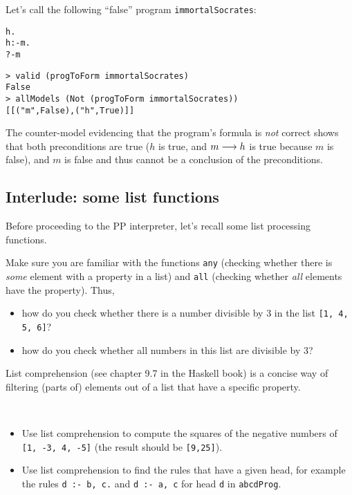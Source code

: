 \documentclass[english]{article}
\begin{document}
Let's call the following ``false'' program \texttt{immortalSocrates}:
\begin{alltt}
  h.
  h :- m.
  ?- m
\end{alltt}

\begin{lstlisting}
> valid (progToForm immortalSocrates)
False
> allModels (Not (progToForm immortalSocrates))
[[("m",False),("h",True)]]
\end{lstlisting}
The counter-model evidencing that the program's formula is \emph{not} correct
shows that both preconditions are true ($h$ is true, and $m \longrightarrow h$ is true
because $m$ is false), and $m$ is false and thus cannot be a conclusion of the
preconditions.


\subsection{Interlude: some list functions}\label{sec:list_functions}

Before proceeding to the PP interpreter, let's recall some list processing functions.

\begin{exo}\label{exo:any_all}
  Make sure you are familiar with the functions \texttt{any} (checking whether
  there is \emph{some} element with a property in a list) and \texttt{all}
  (checking whether \emph{all} elements have the property). Thus,
  \begin{itemize}
  \item how do you check whether there is a number divisible by 3 in the list
    \texttt{[1, 4, 5, 6]}?
  \item how do you check whether all numbers in this list are divisible by 3?
  \end{itemize}
\end{exo}

List comprehension (see chapter 9.7 in the Haskell book) is a concise way of
filtering (parts of) elements out of a list that have a specific property.
\begin{exo}\label{exo:list_comprehension}\
  \begin{itemize}
  \item Use list comprehension to compute the squares of the negative numbers
    of \texttt{[1, -3, 4, -5]} (the result should be \texttt{[9,25]}).
  \item Use list comprehension to find the rules that have a given head, for
    example the rules \texttt{d :- b, c.} and \texttt{d :- a, c} for head
    \texttt{d} in \texttt{abcdProg}.
  \end{itemize}
\end{exo}
\end{document}
